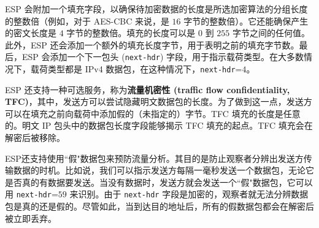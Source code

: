 \begin{snote}[填充及下一包头字段。]
ESP 会附加一个填充字段，以确保待加密数据的长度是所选加密算法的分组长度的整数倍（例如，对于 AES-CBC 来说，是 $16$ 字节的整数倍）。它还能确保产生的密文长度是 $4$ 字节的整数倍。填充的长度可以是 $0$ 到 $255$ 字节之间的任何值。此外，ESP 还会添加一个额外的填充长度字节，用于表明之前的填充字节数。最后，ESP 会添加一个下一包头 (\texttt{next-hdr}) 字段，用于指示载荷类型。在大多数情况下，载荷类型都是 IPv4 数据包，在这种情况下，\texttt{next-hdr}=$4$。

ESP 还支持一种可选服务，称为\textbf{流量机密性 (traffic flow confidentiality, TFC)}，其中，发送方可以尝试隐藏明文数据包的长度。为了做到这一点，发送方可以在填充之前向载荷中添加假的（未指定的）字节。TFC 填充的长度是任意的。明文 IP 包头中的数据包长度字段能够揭示 TFC 填充的起点。TFC 填充会在解密后被移除。

ESP还支持使用``假"数据包来预防流量分析。其目的是防止观察者分辨出发送方传输数据的时机。比如说，我们可以指示发送方每隔一毫秒发送一个数据包，无论它是否真的有数据要发送。当没有数据时，发送方就会发送一个``假"数据包，它可以用 \texttt{next-hdr}=$59$ 来识别。由于 \texttt{next-hdr} 字段是加密的，观察者就无法分辨数据包是真的还是假的。尽管如此，当到达目的地址后，所有的假数据包都会在解密后被立即丢弃。
\end{snote}

